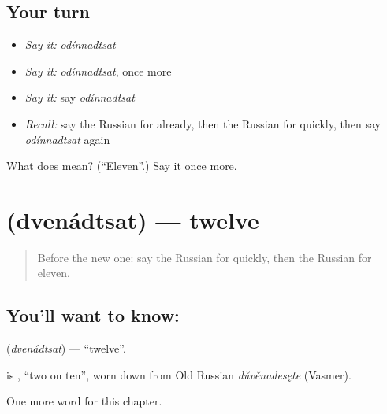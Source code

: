 \subsection*{Your turn}
\begin{itemize}
\raggedright
  \item \emph{Say it:} \emph{odínnadtsat}
  \item \emph{Say it:} \emph{odínnadtsat}, once more
  \item \emph{Say it:} say \emph{odínnadtsat}
  \item \emph{Recall:} say the Russian for already, then the Russian for quickly, then say \emph{odínnadtsat} again
\end{itemize}

\begin{tcolorbox}[breakable,colback=teal!4,colframe=teal!35!black,title={Before you move on}]
What does  mean? (\textquotedblleft{}Eleven\textquotedblright{}.) Say it once more.
\end{tcolorbox}
\section[\texorpdfstring{\ru{двенадцать} (dvenádtsat)}{двенадцать (dvenádtsat)}]{ (dvenádtsat) — twelve}

\label{lesson:RU-C75-twelve}



\begin{quote}
Before the new one: say the Russian for quickly, then the Russian for eleven.
\end{quote}

\subsection*{You'll want to know: }
\textbf{} (\emph{dvenádtsat}) — \textquotedblleft{}twelve\textquotedblright{}.

\begin{cousinweb}
\textbf{} is \emph{  }, \textquotedblleft{}two on ten\textquotedblright{}, worn down from Old Russian \emph{dŭvěnadesęte} (Vasmer).
\end{cousinweb}

\begin{grammarlens}[title={What you've built}]
One more word for this chapter.
\end{grammarlens}


